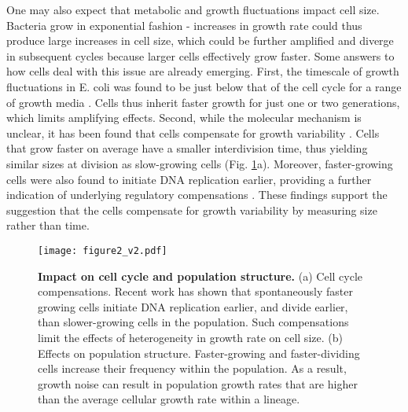 One may also expect that metabolic and growth fluctuations impact cell size. Bacteria grow in exponential fashion - increases in growth rate could thus produce large increases in cell size, which could be further amplified and diverge in subsequent cycles because larger cells effectively grow faster. Some answers to how cells deal with this issue are already emerging. First, the timescale of growth fluctuations in E. coli was found to be just below that of the cell cycle for a range of growth media \cite{Kiviet2014}. Cells thus inherit faster growth for just one or two generations, which limits amplifying effects. Second, while the molecular mechanism is unclear, it has been found that cells compensate for growth variability \cite{Adiciptaningrum2015, Iyer-Biswas2014a, Kennard2016, Osella2017, Wallden2016, Taheri-Araghi2014, Campos2014}. Cells that grow faster on average have a smaller interdivision time, thus yielding similar sizes at division as slow-growing cells (Fig. \ref{fig:literature:fig2}a). Moreover, faster-growing cells were also found to initiate DNA replication earlier, providing a further indication of underlying regulatory compensations \cite{Adiciptaningrum2015, Wallden2016}. These findings support the suggestion that the cells compensate for growth variability by measuring size rather than time. 

\begin{figure}[t]
    \begin{minipage}{0.73\textwidth}
        \texttt{[image: figure2\_v2.pdf]}
    \end{minipage}\hfill
    \begin{minipage}{0.27\textwidth}
        \caption{ 
            \textbf{Impact on cell cycle and population structure.}            
            (a) Cell cycle compensations. Recent work has shown that spontaneously faster growing cells initiate DNA replication earlier, and divide earlier, than slower-growing cells in the population. Such compensations limit the effects of heterogeneity in growth rate on cell size. (b) Effects on population structure. Faster-growing and faster-dividing cells increase their frequency within the population. As a result, growth noise can result in population growth rates that are higher than the average cellular growth rate within a lineage.               
        }
        \label{fig:literature:fig2}
    \end{minipage}
\end{figure}

